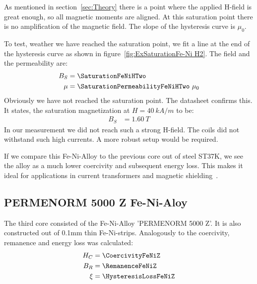 \documentclass[a4paper,10pt,twocolumn]{article}
\begin{document}
    As mentioned in section~\ref{sec:Theory} there is a point where the applied H-field is great enough,
    so all magnetic moments are aligned.
    At this saturation point there is no amplification of the magnetic field.
    The slope of the hysteresis curve is $\mu_0$.
    
    To test, weather we have reached the saturation point, we fit a line at the end of the hysteresis
    curve as shown in figure~\ref{fig:ExSaturationFe-Ni H2}.
    The field and the permeability are:
    \begin{align*}
        B_S &= \SaturationFeNiHTwo \\
        \mu &= \SaturationPermeabilityFeNiHTwo \ \mu_0
    \end{align*}
    Obviously we have not reached the saturation point.
    The datasheet confirms this.
    It states, the saturation magnetization at $H = 40 \ kA/m$ to be:
    \begin{align*}
        B_S &= 1.60 \ T
    \end{align*}
    In our measurement we did not reach such a strong H-field.
    The coils did not withstand such high currents.
    A more robust setup would be required.
    
    If we compare this Fe-Ni-Alloy to the previous core out of steel ST37K, we see the alloy as a much lower coercivity and subsequent energy
    loss.
    This makes it ideal for applications in current transformers and magnetic shielding~\cite{feniDatasheet}.
    
    \subsection{PERMENORM 5000 Z Fe-Ni-Aloy}
    
    
    The third core consisted of the Fe-Ni-Alloy 'PERMENORM 5000 Z'.
    It is also constructed out of 0.1mm thin Fe-Ni-strips.
    Analogously to the coercivity, remanence and energy loss was calculated:
    \begin{align*}
        H_C &= \CoercivityFeNiZ \\
        B_R &= \RemanenceFeNiZ \\
        \xi &= \HysteresisLossFeNiZ
    \end{align*}
    
\end{document}
